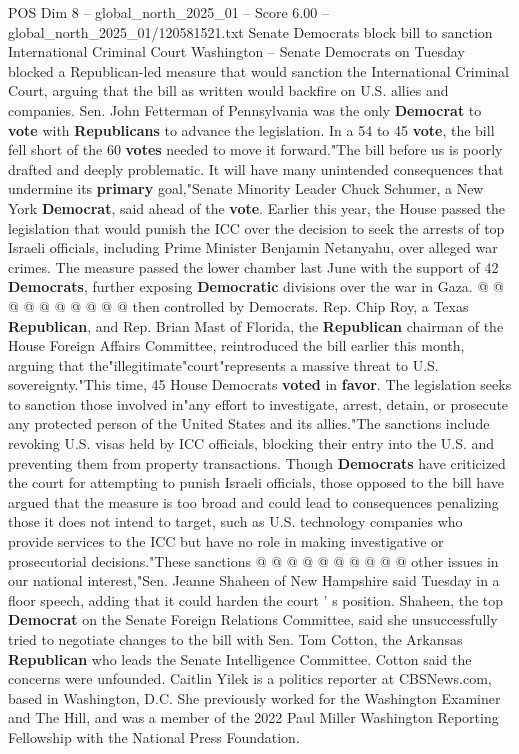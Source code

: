 \begin{textsample}{POS Dim 8 – global\_north\_2025\_01 – Score 6.00 – global\_north\_2025\_01/120581521.txt}  \label{ex:f8_pos_294}
Senate Democrats block bill to sanction International Criminal Court Washington -- Senate Democrats on Tuesday blocked a Republican-led measure that would sanction the International Criminal Court, arguing that the bill as written would backfire on U.S. allies and companies.
Sen.
John Fetterman of Pennsylvania was the only \textbf{Democrat} to \textbf{vote} with \textbf{Republicans} to advance the legislation.
In a 54 to 45 \textbf{vote}, the bill fell short of the 60 \textbf{votes} needed to move it forward."The bill before us is poorly drafted and deeply problematic.
It will have many unintended consequences that undermine its \textbf{primary} goal,"Senate Minority Leader Chuck Schumer, a New York \textbf{Democrat}, said ahead of the \textbf{vote}.
Earlier this year, the House passed the legislation that would punish the ICC over the decision to seek the arrests of top Israeli officials, including Prime Minister Benjamin Netanyahu, over alleged war crimes.
The measure passed the lower chamber last June with the support of 42 \textbf{Democrats}, further exposing \textbf{Democratic} divisions over the war in Gaza. @ @ @ @ @ @ @ @ @ @ then controlled by Democrats.
Rep.
Chip Roy, a Texas \textbf{Republican}, and Rep.
Brian Mast of Florida, the \textbf{Republican} chairman of the House Foreign Affairs Committee, reintroduced the bill earlier this month, arguing that the"illegitimate"court"represents a massive threat to U.S. sovereignty."This time, 45 House Democrats \textbf{voted} in \textbf{favor}.
The legislation seeks to sanction those involved in"any effort to investigate, arrest, detain, or prosecute any protected person of the United States and its allies."The sanctions include revoking U.S. visas held by ICC officials, blocking their entry into the U.S. and preventing them from property transactions.
Though \textbf{Democrats} have criticized the court for attempting to punish Israeli officials, those opposed to the bill have argued that the measure is too broad and could lead to consequences penalizing those it does not intend to target, such as U.S. technology companies who provide services to the ICC but have no role in making investigative or prosecutorial decisions."These sanctions @ @ @ @ @ @ @ @ @ @ other issues in our national interest,"Sen.
Jeanne Shaheen of New Hampshire said Tuesday in a floor speech, adding that it could harden the court ' s position.
Shaheen, the top \textbf{Democrat} on the Senate Foreign Relations Committee, said she unsuccessfully tried to negotiate changes to the bill with Sen.
Tom Cotton, the Arkansas \textbf{Republican} who leads the Senate Intelligence Committee.
Cotton said the concerns were unfounded.
Caitlin Yilek is a politics reporter at CBSNews.com, based in Washington, D.C.
She previously worked for the Washington Examiner and The Hill, and was a member of the 2022 Paul Miller Washington Reporting Fellowship with the National Press Foundation.

\end{textsample}
